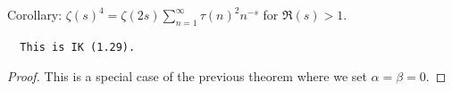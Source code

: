 \begin{theorem}
\label{zeta_pow_four_eq}
\leanok
Corollary: $\zeta(s)^4 = \zeta(2s) \sum_{n=1}^{\infty} \tau(n)^2 n^{-s}$ for $\Re(s) > 1$.
  \begin{verbatim}
  This is IK (1.29).
  \end{verbatim}
\end{theorem}
\begin{proof}
\leanok
This is a special case of the previous theorem where we set $\alpha = \beta = 0$.
\end{proof}
